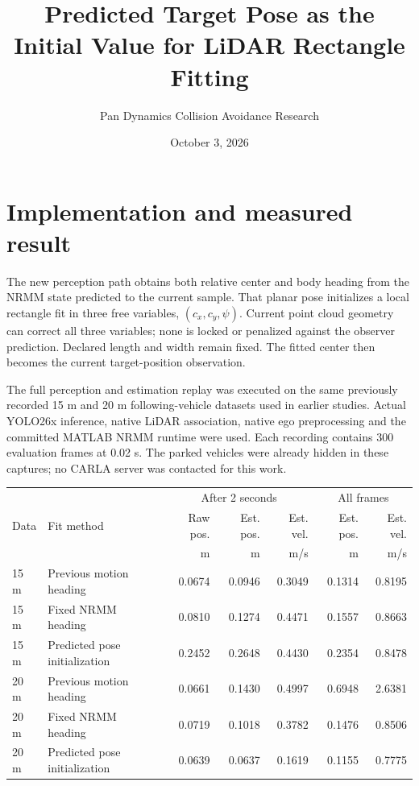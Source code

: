 \documentclass[11pt]{article}
\title{Predicted Target Pose as the Initial Value for LiDAR Rectangle Fitting}
\author{Pan Dynamics Collision Avoidance Research}\date{October 3, 2026}
\begin{document}
\maketitle
\section{Implementation and measured result}
The new perception path obtains both relative center and body heading from the
NRMM state predicted to the current sample. That planar pose initializes a
local rectangle fit in three free variables, $(c_x,c_y,\psi)$. Current point
cloud geometry can correct all three variables; none is locked or penalized
against the observer prediction. Declared length and width remain fixed.
The fitted center then becomes the current target-position observation.

The full perception and estimation replay was executed on the same previously
recorded 15 m and 20 m following-vehicle datasets used in earlier studies.
Actual YOLO26x inference, native LiDAR association, native ego preprocessing
and the committed MATLAB NRMM runtime were used. Each recording contains
300 evaluation frames at 0.02 s. The parked vehicles were already hidden in
these captures; no CARLA server was contacted for this work.

\begin{center}\scriptsize
\begin{tabular}{@{}llrrrrr@{}}\toprule
 & & \multicolumn{3}{c}{After 2 seconds} & \multicolumn{2}{c}{All frames} \\
Data & Fit method & Raw pos. & Est. pos. & Est. vel. & Est. pos. & Est. vel. \\
 & & m & m & m/s & m & m/s \\\midrule
15 m & Previous motion heading & 0.0674 & 0.0946 & 0.3049 & 0.1314 & 0.8195 \\
15 m & Fixed NRMM heading & 0.0810 & 0.1274 & 0.4471 & 0.1557 & 0.8663 \\
15 m & Predicted pose initialization & 0.2452 & 0.2648 & 0.4430 & 0.2354 & 0.8478 \\
20 m & Previous motion heading & 0.0661 & 0.1430 & 0.4997 & 0.6948 & 2.6381 \\
20 m & Fixed NRMM heading & 0.0719 & 0.1018 & 0.3782 & 0.1476 & 0.8506 \\
20 m & Predicted pose initialization & 0.0639 & 0.0637 & 0.1619 & 0.1155 & 0.7775 \\
\bottomrule\end{tabular}\end{center}
\end{document}
